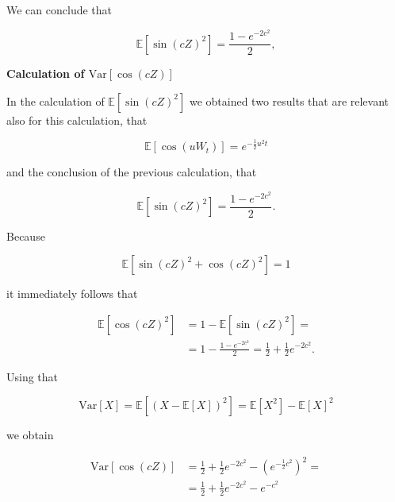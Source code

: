 \documentclass{letter}
\begin{document}
We can conclude that

$$\mathbb{E}\left[\sin(cZ)^2\right]=\frac{1-e^{-2c^2}}{2},$$

{\bf Calculation of \boldmath$\text{Var}\left[\cos(cZ)\right]$}

In the calculation of $\mathbb{E}[\sin(cZ)^2]$ we obtained two results that are relevant also for this calculation, that

$$\mathbb{E}[\cos(uW_t)]=e^{-\frac{1}{2}u^2t}$$

and the conclusion of the previous calculation, that

$$\mathbb{E}[\sin(cZ)^2]=\frac{1-e^{-2c^2}}{2}.$$

Because

$$\mathbb{E}\left[\sin(cZ)^2+\cos(cZ)^2\right]=1$$

it immediately follows that

\begin{equation*}
\begin{split}
\mathbb{E}\left[\cos(cZ)^2\right]&=1-\mathbb{E}\left[\sin(cZ)^2\right]=\\
&=1-\frac{1-e^{-2c^2}}{2}=\frac{1}{2}+\frac{1}{2}e^{-2c^2}.
\end{split}
\end{equation*}

Using that

$$\text{Var}\left[X\right]=\mathbb{E}\left[\left(X-\mathbb{E}\left[X\right]\right)^2\right]=\mathbb{E}[X^2]-\mathbb{E}[X]^2$$

we obtain

\begin{equation*}
\begin{split}
\text{Var}\left[\cos\left(cZ\right)\right]&=\frac{1}{2}+\frac{1}{2}e^{-2c^2}-\left(e^{-\frac{1}{2}c^2}\right)^2=\\
&=\frac{1}{2}+\frac{1}{2}e^{-2c^2}-e^{-c^2}
\end{split}
\end{equation*}
\end{document}
